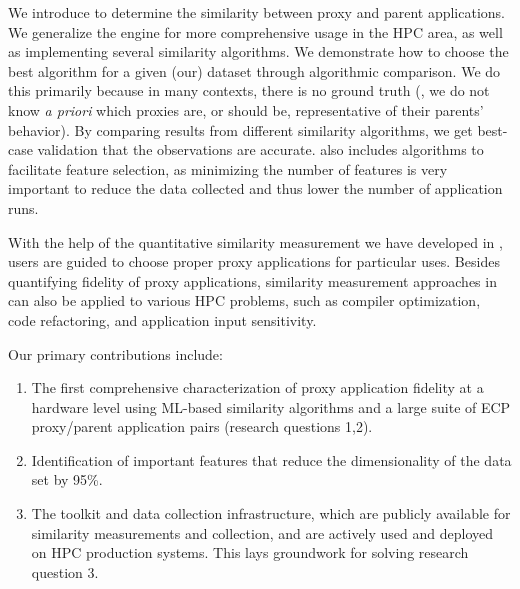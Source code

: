 We introduce \us to determine the similarity between proxy and parent applications. We generalize the engine for more comprehensive usage in the HPC area, as well as implementing several similarity algorithms.  We demonstrate how to choose the best algorithm for a given (our) dataset through algorithmic comparison. We do this primarily because in many contexts, there is no ground truth (\ie, we do not know \textit{a priori} which proxies are, or should be, representative of their parents' behavior). By comparing results from different similarity algorithms, we get best-case validation that the observations are accurate. \us also includes algorithms to facilitate feature selection, as minimizing the number of features is very important to reduce the data collected and thus lower the number of application runs.

With the help of the quantitative similarity measurement we have developed in \us, users are guided to choose proper proxy applications for particular uses. Besides quantifying fidelity of proxy applications, similarity measurement approaches in \us can also be applied to various HPC problems, such as compiler optimization, code refactoring, and application input sensitivity.


Our primary contributions include:
\begin{enumerate}
    \item The first comprehensive characterization of proxy application fidelity at a hardware level using ML-based similarity algorithms and a large suite of ECP proxy/parent application pairs (research questions 1,2). %
    \item 
    Identification of important features that reduce the dimensionality of the data set by 95\%.
    \item The \us toolkit and data collection infrastructure, which are publicly available for similarity measurements and collection, and are actively used and deployed on HPC production systems.  This lays groundwork for solving research question 3. %
\end{enumerate}

